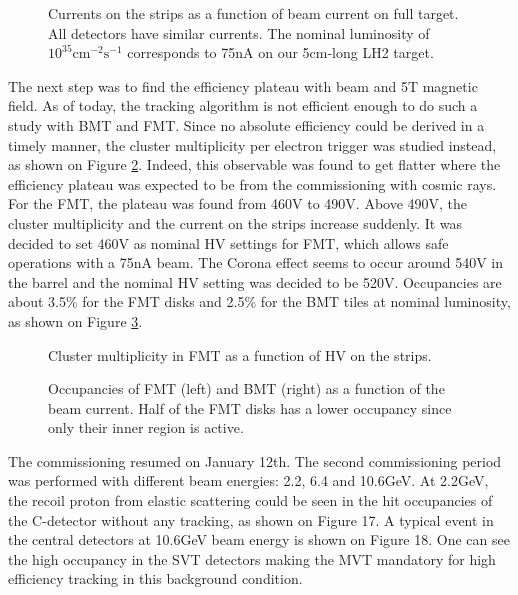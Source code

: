 \begin{figure}[htb]
 \caption{Currents on the strips as a function of beam current on full target. All detectors have similar currents. The 
nominal luminosity of $10^{35}\text{cm}^{-2}\text{s}^{-1}$ corresponds to 75nA on our 5cm-long LH2 target.}
 \label{fig:mm-fig14}
\end{figure}

The next step was to find the efficiency plateau with beam and 5T magnetic field. As of today, the tracking algorithm 
is not efficient enough to do such a study with BMT and FMT. Since no absolute efficiency could be derived in a timely 
manner, the cluster multiplicity per electron trigger was studied instead, as shown on Figure \ref{fig:mm-fig15}. 
Indeed, this observable was found to get flatter where the efficiency plateau was expected to be from the commissioning 
with cosmic rays.  For the FMT, the plateau was found from 460V to 490V. Above 490V, the cluster multiplicity and the 
current on the strips increase suddenly. It was decided to set 460V as nominal HV settings for FMT, which allows safe 
operations with a 75nA beam. The Corona effect seems to occur around 540V in the barrel and the nominal HV setting was 
decided to be 520V.  Occupancies are about 3.5\% for the FMT disks and 2.5\% for the BMT tiles at nominal luminosity, 
as shown on Figure \ref{fig:mm-fig16}.


\begin{figure}[htb]
 \caption{Cluster multiplicity in FMT as a function of HV on the strips.}
 \label{fig:mm-fig15}
\end{figure}


\begin{figure}[htb]
 \caption{Occupancies of FMT (left) and BMT (right) as a function of the beam current. Half of the FMT disks has a 
lower occupancy since only their inner region is active.}
 \label{fig:mm-fig16}
\end{figure}

The commissioning resumed on January 12th.  The second commissioning period was performed with different beam energies: 
2.2, 6.4 and 10.6GeV. At 2.2GeV, the recoil proton from elastic scattering could be seen in the hit occupancies of the 
C-detector without any tracking, as shown on Figure 17. A typical event in the central detectors at 10.6GeV beam energy 
is shown on Figure 18. One can see the high occupancy in the SVT detectors making the MVT mandatory for high efficiency 
tracking in this background condition.



